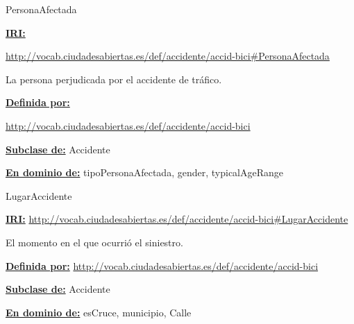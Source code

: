 \begin{mybox}{PersonaAfectada}
\begin{flushleft}
\underline{\textbf{IRI:}}

\url{http://vocab.ciudadesabiertas.es/def/accidente/accid-bici#PersonaAfectada}
\newline

La persona perjudicada por el accidente de tráfico.
\newline

\underline{\textbf{Definida por:}}

\url{http://vocab.ciudadesabiertas.es/def/accidente/accid-bici}
\newline

\underline{\textbf{Subclase de:}}
\newline Accidente
\newline

\underline{\textbf{En dominio de:}}
\newline tipoPersonaAfectada, \hspace{2em} gender, \hspace{2em} typicalAgeRange

\end{flushleft}
\end{mybox}


\begin{mybox}{LugarAccidente}
\begin{flushleft}
\underline{\textbf{IRI:}}
\url{http://vocab.ciudadesabiertas.es/def/accidente/accid-bici#LugarAccidente}
\newline

El momento en el que ocurrió el siniestro.
\newline

\underline{\textbf{Definida por:}}
\url{http://vocab.ciudadesabiertas.es/def/accidente/accid-bici}
\newline

\underline{\textbf{Subclase de:}}
\newline Accidente
\newline

\underline{\textbf{En dominio de:}}
\newline esCruce, \hspace{2em} municipio, \hspace{2em} Calle

\end{flushleft}
\end{mybox}


